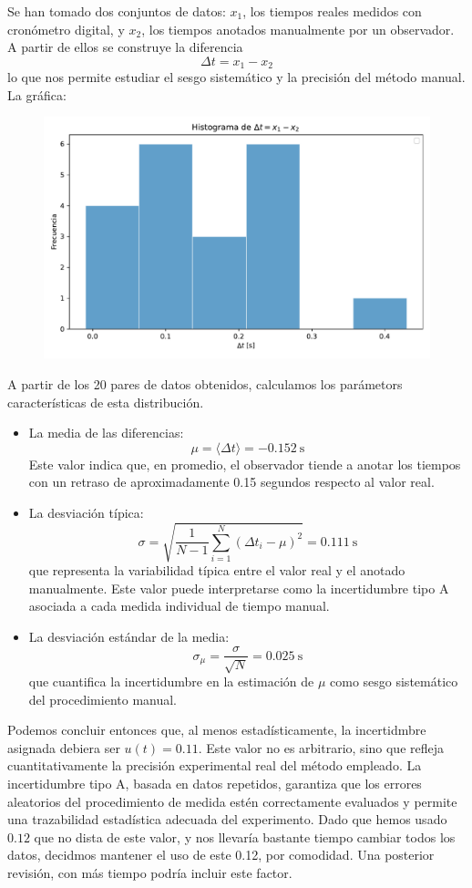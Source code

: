 \documentclass[11pt]{article}
\begin{document}
\begin{itemize}
	Se han tomado dos conjuntos de datos: $x_1$, los tiempos reales medidos con cronómetro digital, y $x_2$, los tiempos anotados manualmente por un observador. A partir de ellos se construye la diferencia
	\[
	\Delta t = x_1 - x_2
	\]
	lo que nos permite estudiar el sesgo sistemático y la precisión del método manual. La gráfica: 

	\begin{figure}[h!] \centering
		\includegraphics[width=0.6\linewidth]{../Tiempo.pdf}
	\end{figure}
	
	A partir de los 20 pares de datos obtenidos, calculamos los parámetors características de esta distribución.
	
	\begin{itemize}
		\item La media de las diferencias:
		\[
		\mu = \langle \Delta t \rangle = -0.152\ \text{s}
		\]
		Este valor indica que, en promedio, el observador tiende a anotar los tiempos con un retraso de aproximadamente 0.15 segundos respecto al valor real.
	
		\item La desviación típica:
		\[
		\sigma = \sqrt{ \frac{1}{N-1} \sum_{i=1}^{N} (\Delta t_i - \mu)^2 } = 0.111\ \text{s}
		\]
		que representa la variabilidad típica entre el valor real y el anotado manualmente. Este valor puede interpretarse como la incertidumbre tipo A asociada a cada medida individual de tiempo manual.
	
		\item La desviación estándar de la media:
		\[
		\sigma_{\mu} = \frac{\sigma}{\sqrt{N}} = 0.025\ \text{s}
		\]
		que cuantifica la incertidumbre en la estimación de $\mu$ como sesgo sistemático del procedimiento manual.
	\end{itemize}
	Podemos concluir entonces que, al menos estadísticamente, la incertidmbre asignada debiera ser $u(t)=0.11$.
	Este valor no es arbitrario, sino que refleja cuantitativamente la precisión experimental real del método empleado. La incertidumbre tipo A, basada en datos repetidos, garantiza que los errores aleatorios del procedimiento de medida estén correctamente evaluados y permite una trazabilidad estadística adecuada del experimento. Dado que hemos usado $0.12$ que no dista de este valor, y nos llevaría bastante tiempo cambiar todos los datos, decidmos mantener el uso de este 0.12, por comodidad. Una posterior revisión, con más tiempo podría incluir este factor. 
	

\end{itemize}
\end{document}
